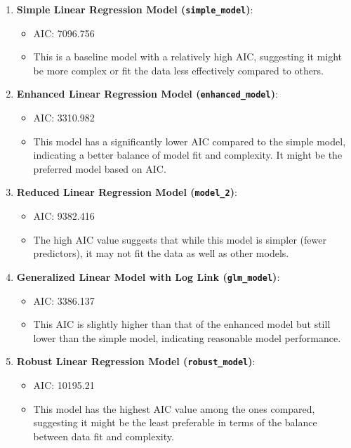 \documentclass[
]{article}
\providecommand{\tightlist}{%
  \setlength{\itemsep}{0pt}\setlength{\parskip}{0pt}}
\begin{document}
\begin{enumerate}
\def\labelenumi{\arabic{enumi}.}
\tightlist
\item
  \textbf{Simple Linear Regression Model (\texttt{simple\_model})}:

  \begin{itemize}
  \tightlist
  \item
    AIC: 7096.756
  \item
    This is a baseline model with a relatively high AIC, suggesting it
    might be more complex or fit the data less effectively compared to
    others.
  \end{itemize}
\item
  \textbf{Enhanced Linear Regression Model (\texttt{enhanced\_model})}:

  \begin{itemize}
  \tightlist
  \item
    AIC: 3310.982
  \item
    This model has a significantly lower AIC compared to the simple
    model, indicating a better balance of model fit and complexity. It
    might be the preferred model based on AIC.
  \end{itemize}
\item
  \textbf{Reduced Linear Regression Model (\texttt{model\_2})}:

  \begin{itemize}
  \tightlist
  \item
    AIC: 9382.416
  \item
    The high AIC value suggests that while this model is simpler (fewer
    predictors), it may not fit the data as well as other models.
  \end{itemize}
\item
  \textbf{Generalized Linear Model with Log Link (\texttt{glm\_model})}:

  \begin{itemize}
  \tightlist
  \item
    AIC: 3386.137
  \item
    This AIC is slightly higher than that of the enhanced model but
    still lower than the simple model, indicating reasonable model
    performance.
  \end{itemize}
\item
  \textbf{Robust Linear Regression Model (\texttt{robust\_model})}:

  \begin{itemize}
  \tightlist
  \item
    AIC: 10195.21
  \item
    This model has the highest AIC value among the ones compared,
    suggesting it might be the least preferable in terms of the balance
    between data fit and complexity.
  \end{itemize}
\end{enumerate}
\end{document}
